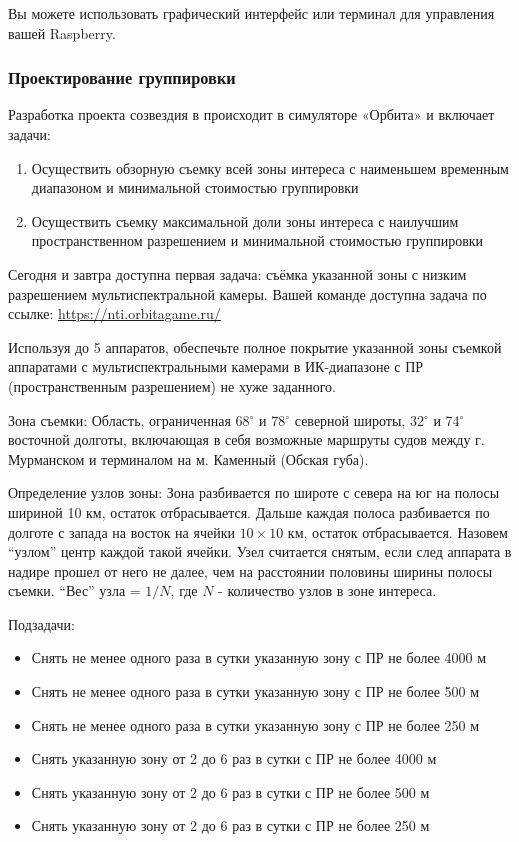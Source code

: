 Вы можете использовать графический интерфейс или терминал для управления вашей Raspberry.

\subsubsection*{Проектирование группировки}

Разработка проекта созвездия в происходит в симуляторе «Орбита» и включает задачи:
\begin{enumerate}
    \item Осуществить обзорную съемку всей зоны интереса с наименьшем временным диапазоном и минимальной стоимостью группировки
    \item Осуществить съемку максимальной доли зоны интереса с наилучшим пространственном разрешением и минимальной стоимостью группировки
\end{enumerate}

Сегодня и завтра доступна первая задача: съёмка указанной зоны с низким разрешением мультиспектральной камеры. Вашей команде доступна задача по ссылке: \url{https://nti.orbitagame.ru/}


Используя до 5 аппаратов, обеспечьте полное покрытие указанной зоны съемкой аппаратами с мультиспектральными камерами в ИК-диапазоне с ПР (пространственным разрешением) не хуже заданного.

Зона съемки: Область, ограниченная 68$^\circ$ и 78$^\circ$ северной широты, 32$^\circ$ и 74$^\circ$ восточной долготы, включающая в себя возможные маршруты судов между г. Мурманском и терминалом на м. Каменный (Обская губа).

Определение узлов зоны: Зона разбивается по широте с севера на юг на полосы шириной 10 км, остаток отбрасывается. Дальше каждая полоса разбивается по долготе с запада на восток на ячейки $10 \times 10$ км, остаток отбрасывается. Назовем “узлом” центр каждой такой ячейки. Узел считается снятым, если след аппарата в надире прошел от него не далее, чем на расстоянии половины ширины полосы съемки. “Вес” узла = $1/N$, где $N$ - количество узлов в зоне интереса.

Подзадачи:
\begin{itemize}
    \item Снять не менее одного раза в сутки указанную зону с ПР не более 4000 м
    \item Снять не менее одного раза в сутки указанную зону с ПР не более 500 м
    \item Снять не менее одного раза в сутки указанную зону с ПР не более 250 м
    \item Снять указанную зону от 2 до 6 раз в сутки с ПР не более 4000 м
    \item Снять указанную зону от 2 до 6 раз в сутки с ПР не более 500 м
    \item Снять указанную зону от 2 до 6 раз в сутки с ПР не более 250 м
\end{itemize}

